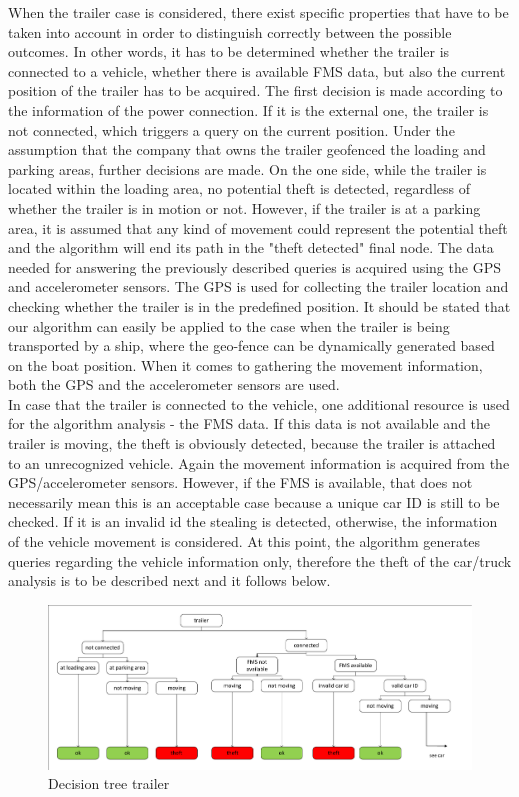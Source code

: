 When the trailer case is considered, there exist specific properties that have to be taken into account in order to distinguish correctly between the possible outcomes. In other words, it has to be determined whether the trailer is connected to a vehicle, whether there is available FMS data, but also the current position of the trailer has to be acquired. 
The first decision is made according to the information of the power connection. If it is the external one, the trailer is not connected, which triggers a query on the current position. Under the assumption that the company that owns the trailer geofenced the loading and parking areas, further decisions are made. On the one side, while the trailer is located within the loading area, no potential theft is detected, regardless of whether the trailer is in motion or not. However, if the trailer is at a parking area, it is assumed that any kind of movement could represent the potential theft and the algorithm will end its path in the "theft detected" final node. The data needed for answering the previously described queries is acquired using the GPS and accelerometer sensors. The GPS is used for collecting the trailer location and checking whether the trailer is in the predefined position. It should be stated that our algorithm can easily be applied to the case when the trailer is being transported by a ship, where the geo-fence can be dynamically generated based on the boat position. When it comes to gathering the movement information, both the GPS and the accelerometer sensors are used. \\
In case that the trailer is connected to the vehicle, one additional resource is used for the algorithm analysis - the FMS data. If this data is not available and the trailer is moving, the theft is obviously detected, because the trailer is attached to an unrecognized vehicle. Again the movement information is acquired from the GPS/accelerometer sensors. However, if the FMS is available, that does not necessarily mean this is an acceptable case because a unique car ID is still to be checked. If it is an invalid id the stealing is detected, otherwise, the information of the vehicle movement is considered. At this point, the algorithm generates queries regarding the vehicle information only, therefore the theft of the car/truck analysis is to be described next and it follows below.

\begin{figure} [h]
    \includegraphics[clip, trim=0.1cm 0.1cm 0.1cm 0.1cm, width=1\textwidth]{src/pic/DecisionTreeTrailer}
    \caption{Decision tree trailer}
    \label{fig::decisionTreeTrailer}
\end{figure}

